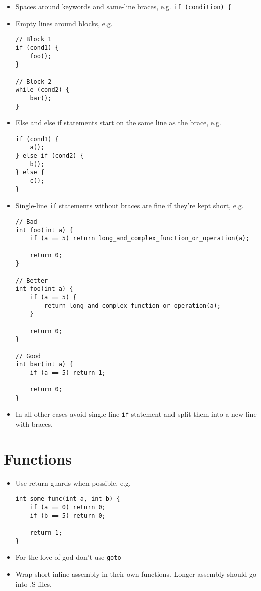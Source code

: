 \documentclass{article}
\begin{document}
\begin{itemize}
	\item Spaces around keywords and same-line braces, e.g. \lstinline{if (condition) { }
	\item Empty lines around blocks, e.g.
	\begin{lstlisting}
// Block 1
if (cond1) {
	foo();
}

// Block 2
while (cond2) {
	bar();
}
	\end{lstlisting}

	\item Else and else if statements start on the same line as the brace, e.g.
	\begin{lstlisting}
if (cond1) {
	a();
} else if (cond2) {
	b();
} else {
	c();
}
	\end{lstlisting}

	\item Single-line \lstinline{if} statements without braces are fine if they're kept short, e.g.
	
	\begin{lstlisting}
// Bad
int foo(int a) {
	if (a == 5) return long_and_complex_function_or_operation(a);

	return 0;
}

// Better
int foo(int a) {
	if (a == 5) {
		return long_and_complex_function_or_operation(a);
	}

	return 0;
}

// Good
int bar(int a) {
	if (a == 5) return 1;

	return 0;
}
	\end{lstlisting}

	\item In all other cases avoid single-line \lstinline{if} statement and split them into a new line with braces.
\end{itemize}

\section{Functions}
\begin{itemize}
	\item Use return guards when possible, e.g.
	\begin{lstlisting}
int some_func(int a, int b) {
	if (a == 0) return 0;
	if (b == 5) return 0;

	return 1;
}
	\end{lstlisting}

	\item For the love of god don't use \lstinline{goto}
	\item Wrap short inline assembly in their own functions. Longer assembly should go into .S files.
\end{itemize}
\end{document}
